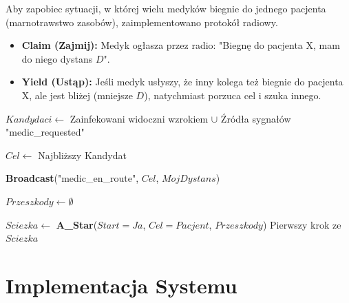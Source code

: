 \documentclass[12pt,a4paper]{article}
\begin{document}
Aby zapobiec sytuacji, w której wielu medyków biegnie do jednego pacjenta
(marnotrawstwo zasobów), zaimplementowano protokół radiowy.
\begin{itemize}
	\item \textbf{Claim (Zajmij):} Medyk ogłasza przez radio: "Biegnę do pacjenta X, mam do niego dystans $D$".
	\item \textbf{Yield (Ustąp):} Jeśli medyk usłyszy, że inny kolega też biegnie do pacjenta X, ale jest bliżej (mniejsze $D$), natychmiast porzuca cel i szuka innego.
\end{itemize}

\begin{algorithm}[H]
	\SetAlgoLined
	\caption{Algorytm Medyka (A* i Koordynacja)}

	$Kandydaci \leftarrow$ Zainfekowani widoczni wzrokiem $\cup$ Źródła sygnałów "medic\_requested"\;

	$Cel \leftarrow$ Najbliższy Kandydat\;



	\textbf{Broadcast}("medic\_en\_route", $Cel$, $MojDystans$) 


	$Przeszkody \leftarrow \emptyset$\;

	$Sciezka \leftarrow$ \textbf{A\_Star}($Start=Ja$, $Cel=Pacjent$, $Przeszkody$)\;
	\Return Pierwszy krok ze $Sciezka$\;
\end{algorithm}

\section{Implementacja Systemu}
\end{document}
